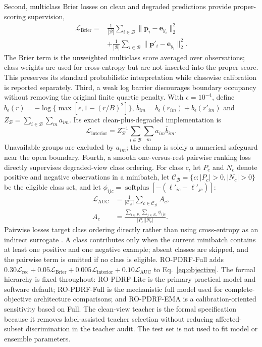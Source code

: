 \documentclass[11pt]{article}
\begin{document}
Second, multiclass Brier losses on clean and degraded predictions provide proper-scoring supervision,
\begin{equation}
\begin{aligned}
\mathcal L_{\mathrm{Brier}}={}&\frac{1}{|\mathcal B|}\sum_{i\in\mathcal B}\|\mathbf p_i-\mathbf e_{y_i}\|_2^2\\
&+\frac{1}{|\mathcal B|}\sum_{i\in\mathcal B}\|\mathbf p'_i-\mathbf e_{y_i}\|_2^2.
\end{aligned}
\end{equation}
The Brier term is the unweighted multiclass score averaged over observations; class weights are used for cross-entropy but are not inserted into the proper score. This preserves its standard probabilistic interpretation while classwise calibration is reported separately.
Third, a weak log barrier discourages boundary occupancy without removing the original finite quartic penalty. With $\epsilon=10^{-4}$, define $b_\epsilon(r)=-\log\{\max[\epsilon,1-(r/B)^2]\}$, $\bar b_{im}=b_\epsilon(r_{im})+b_\epsilon(r'_{im})$ and $Z_{\mathcal B}=\sum_{i\in\mathcal B}\sum_m a_{im}$. Its exact clean-plus-degraded implementation is
\begin{equation}
\mathcal L_{\mathrm{interior}}=Z_{\mathcal B}^{-1}
\sum_{i\in\mathcal B}\sum_m a_{im}\bar b_{im}.
\label{eq:interior}
\end{equation}
Unavailable groups are excluded by $a_{im}$; the clamp is solely a numerical safeguard near the open boundary. Fourth, a smooth one-versus-rest pairwise ranking loss directly supervises degraded-view class ordering. For class $c$, let $P_c$ and $N_c$ denote positive and negative observations in a minibatch, let $\mathcal C_{\mathcal B}=\{c:|P_c|>0,|N_c|>0\}$ be the eligible class set, and let $\phi_{ijc}=\operatorname{softplus}[-(\ell'_{ic}-\ell'_{jc})]$:
\begin{equation}
\begin{aligned}
\mathcal L_{\mathrm{AUC}}&=\frac{1}{|\mathcal C_{\mathcal B}|}\sum_{c\in\mathcal C_{\mathcal B}}A_c,\\
A_c&=\frac{\sum_{i\in P_c}\sum_{j\in N_c}\phi_{ijc}}{|P_c||N_c|}.
\end{aligned}
\label{eq:auc}
\end{equation}
Pairwise losses target class ordering directly rather than using cross-entropy as an indirect surrogate \citep{yang2021pairwise}. A class contributes only when the current minibatch contains at least one positive and one negative example; absent classes are skipped, and the pairwise term is omitted if no class is eligible. RO-PDRF-Full adds $0.30\mathcal L_{\mathrm{rec}}+0.05\mathcal L_{\mathrm{Brier}}+0.005\mathcal L_{\mathrm{interior}}+0.10\mathcal L_{\mathrm{AUC}}$ to Eq.~\eqref{eq:objective}. The formal hierarchy is fixed throughout: RO-PDRF-Lite is the primary practical model and software default; RO-PDRF-Full is the mechanistic full model used for complete-objective architecture comparisons; and RO-PDRF-EMA is a calibration-oriented sensitivity based on Full. The clean-view teacher is the formal specification because it removes label-assisted teacher selection without reducing affected-subset discrimination in the teacher audit. The test set is not used to fit model or ensemble parameters.
\end{document}
